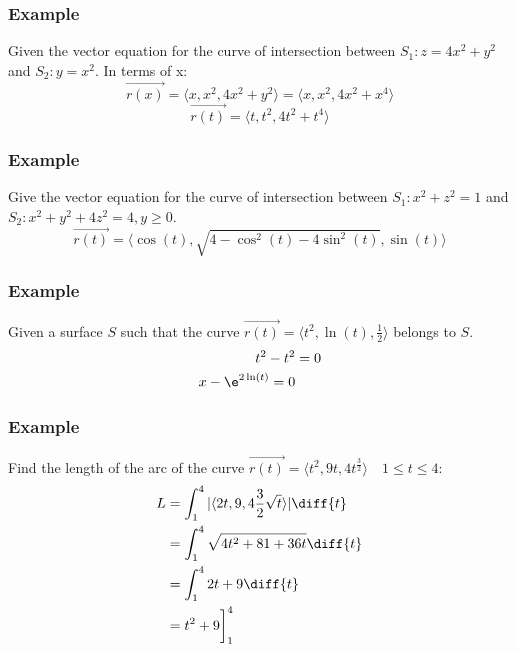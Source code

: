 \documentclass{math}
\begin{document}
\subsubsection*{Example}
Given the vector equation for the curve of intersection between
\( S_1: z = 4x^2+y^2 \) and \( S_2: y = x^2 \). In terms of x:
\[ \vec{r(x)} = \langle x,x^2,4x^2+y^2\rangle = \langle x,x^2,4x^2+x^4\rangle \]
\[ \vec{r(t)} = \langle t,t^2,4t^2+t^4\rangle \]

\subsubsection*{Example}
Give the vector equation for the curve of intersection between
\( S_1: x^2+z^2 = 1 \) and \( S_2: x^2+y^2+4z^2 = 4, y\ge0 \).
\[ \vec{r(t)} = \langle\cos(t),\sqrt{4-\cos^2(t)-4\sin^2(t)},\sin(t)\rangle \]

\subsubsection*{Example}
Given a surface \( S \) such that the curve \( \vec{r(t)} = \langle t^2,\ln(t),
\frac{1}{2}\rangle \) belongs to \( S \).
\begin{align*}
  t^2-t^2 &= 0 \\
  x-\e^{2\ln(t)} = 0
\end{align*}

\subsubsection*{Example}
Find the length of the arc of the curve \( \overrightarrow{r(t)} =
\langle t^2,9t,4t^\frac{3}{2}\rangle \quad 1\le t\le 4 \):
\begin{align*}
  L &= \int_{1}^{4}|\langle2t,9,4\frac{3}{2}\sqrt{t}\rangle|\diff{t} \\
  &= \int_{1}^{4}\sqrt{4t^2+81+36t}\diff{t} \\
  &= \int_{1}^{4}2t+9\diff{t} \\
  &= t^2+9\bigg]^{4}_{1}
\end{align*}
\end{document}

